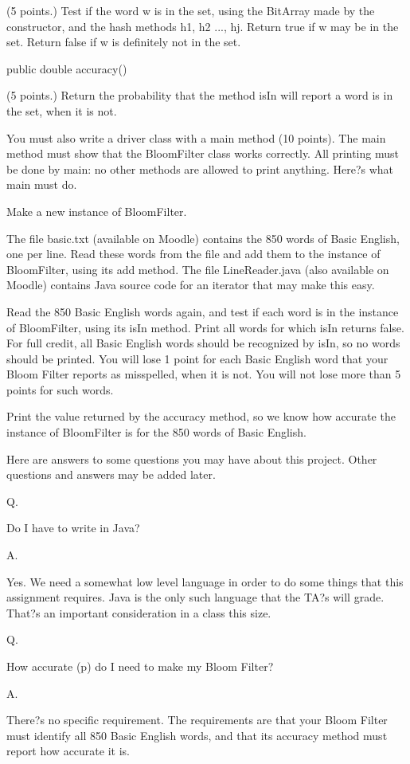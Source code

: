 (5 points.) Test if the word w is in the set, using the BitArray made by the constructor, and the hash methods h1, h2 ..., hj. Return true if w may be in the set. Return false if w is definitely not in the set.

public double accuracy()

(5 points.) Return the probability that the method isIn will report a word is in the set, when it is not.

You must also write a driver class with a main method (10 points). The main method must show that the BloomFilter class works correctly. All printing must be done by main: no other methods are allowed to print anything. Here?s what main must do.

Make a new instance of BloomFilter.

The file basic.txt (available on Moodle) contains the 850 words of Basic English, one per line. Read these words from the file and add them to the instance of BloomFilter, using its add method. The file LineReader.java (also available on Moodle) contains Java source code for an iterator that may make this easy.

Read the 850 Basic English words again, and test if each word is in the instance of BloomFilter, using its isIn method. Print all words for which isIn returns false. For full credit, all Basic English words should be recognized by isIn, so no words should be printed. You will lose 1 point for each Basic English word that your Bloom Filter reports as misspelled, when it is not. You will not lose more than 5 points for such words.

Print the value returned by the accuracy method, so we know how accurate the instance of BloomFilter is for the 850 words of Basic English.

Here are answers to some questions you may have about this project. Other questions and answers may be added later.

Q.  

Do I have to write in Java?

A.  

Yes. We need a somewhat low level language in order to do some things that this assignment requires. Java is the only such language that the TA?s will grade. That?s an important consideration in a class this size.

Q.  

How accurate (p) do I need to make my Bloom Filter?

A.  

There?s no specific requirement. The requirements are that your Bloom Filter must identify all 850 Basic English words, and that its accuracy method must report how accurate it is.

